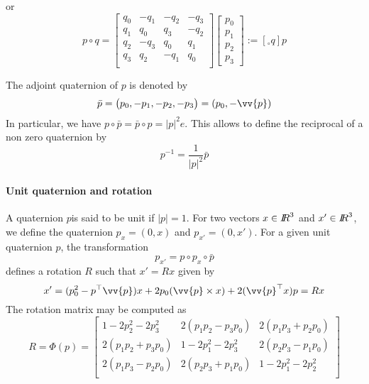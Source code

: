 or
\begin{equation}
  \label{eq:26}
  p \circ q  = 
  \begin{bmatrix}
    q_0 & -q_1 & -q_2 & -q_3 \\
    q_1 & q_0 & q_3 & -q_2 \\
    q_2 & -q_3 & q_0 & q_1 \\
    q_3 & q_2 & -q_1 & q_0 \\
  \end{bmatrix}
  \begin{bmatrix}
    p_0\\
    p_1\\
    p_2\\
    p_3
  \end{bmatrix} := [{}_\circ q] p
\end{equation}

The adjoint quaternion of $p$ is denoted by
\begin{equation}
  \bar p =
  \begin{pmatrix}
    p_0, -p_1, -p_2, -p_3
  \end{pmatrix} = (p_0, - \vv{p})
\end{equation}
In particular, we have $p \circ \bar p = \bar p \circ p = |p|^2 e$. This allows to define the reciprocal of a non zero quaternion by
\begin{equation}
  \label{eq:32}
  p ^{-1} = \frac 1 {|p|^2} \bar p
\end{equation}

\paragraph{Unit quaternion and rotation}
A quaternion $p$is said to be unit if $|p| =1$. For two vectors $x\in \mbox{\rm $I\!\!R$}^3$ and $x'\in \mbox{\rm $I\!\!R$}^3$, we define the quaternion $p_x = (0,x)$ and  $p_{x'} = (0,x')$.
For a given unit quaternion $p$, the transformation
\begin{equation}
  \label{eq:20}
  p_{x'} = p \circ p_x \circ \bar p 
\end{equation}
defines a rotation $R$ such that $x'  = R x$ given by
\begin{equation}
  \label{eq:21}
  x' = (p_0^2- p^\top \vv{p}) x +2 p_0(\vv{p}\times x) +  2 (\vv{p}^\top x) p = R x
\end{equation}
The rotation matrix may be computed as 
\begin{equation}
  \label{eq:19}
  R = \Phi(p) =
  \begin{bmatrix}
    1-2 p_2^2- 2 p_3^2 & 2(p_1p_2-p_3p_0) & 2(p_1p_3+p_2p_0)\\
    2(p_1p_2+p_3p_0) & 1-2 p_1^2- 2 p_3^2 & 2(p_2p_3-p_1p_0)\\
    2(p_1p_3-p_2p_0) & 2(p_2p_3+p_1p_0)  & 1-2 p_1^2- 2 p_2^2\\
  \end{bmatrix}
\end{equation} 


